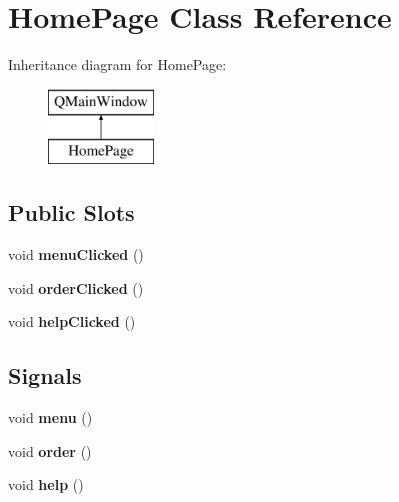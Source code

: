 \hypertarget{class_home_page}{}\section{Home\+Page Class Reference}
\label{class_home_page}
Inheritance diagram for Home\+Page\+:\begin{figure}[H]
\begin{center}
\leavevmode
\includegraphics[height=2.000000cm]{class_home_page}
\end{center}
\end{figure}
\subsection*{Public Slots}
\begin{DoxyCompactItemize}
\item 
void {\bfseries menu\+Clicked} ()\hypertarget{class_home_page_abc8305a0e8d66845d6a1c05d91392de0}{}\label{class_home_page_abc8305a0e8d66845d6a1c05d91392de0}

\item 
void {\bfseries order\+Clicked} ()\hypertarget{class_home_page_a09666cd4c6c0bb7b55949f75e9622b7b}{}\label{class_home_page_a09666cd4c6c0bb7b55949f75e9622b7b}

\item 
void {\bfseries help\+Clicked} ()\hypertarget{class_home_page_a91dc194a54ecd1cb111f11d3ada24bec}{}\label{class_home_page_a91dc194a54ecd1cb111f11d3ada24bec}

\end{DoxyCompactItemize}
\subsection*{Signals}
\begin{DoxyCompactItemize}
\item 
void {\bfseries menu} ()\hypertarget{class_home_page_a5c7e38aa4e8ca1385adf4cb6a8a8b3d4}{}\label{class_home_page_a5c7e38aa4e8ca1385adf4cb6a8a8b3d4}

\item 
void {\bfseries order} ()\hypertarget{class_home_page_ac889b971aa6c77c149e92b51525041b2}{}\label{class_home_page_ac889b971aa6c77c149e92b51525041b2}

\item 
void {\bfseries help} ()\hypertarget{class_home_page_a4a759ea4aba519af70052055fa26a12c}{}\label{class_home_page_a4a759ea4aba519af70052055fa26a12c}

\end{DoxyCompactItemize}
